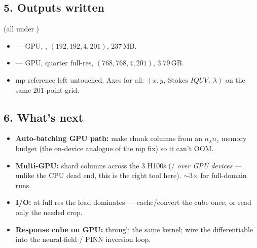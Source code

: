 \subsection*{5. Outputs written} (all under )
\begin{itemize}
  \item {} --- GPU, , $(192,192,4,201)$, 237\,MB.
  \item {} --- GPU, quarter full-res,
        $(768,768,4,201)$, 3.79\,GB.
  \item mp reference  left untouched. Axes for all:
        $(x, y,\ \text{Stokes } I Q U V,\ \lambda)$ on the same 201-point grid.
\end{itemize}

\subsection*{6. What's next}
\begin{itemize}
  \item \textbf{Auto-batching GPU path:} make  chunk columns from an
        $n_\lambda n_z$ memory budget (the on-device analogue of the mp  fix) so it can't OOM.
  \item \textbf{Multi-GPU:} shard columns across the 3 H100s (/ \emph{over
        GPU devices} --- unlike the CPU  dead end, this is the right tool here). $\sim$3$\times$
        for full-domain runs.
  \item \textbf{I/O:} at full res the load dominates --- cache/convert the cube once, or read only the
        needed crop.
  \item \textbf{Response cube on GPU:}  through the same kernel; wire the
        differentiable  into the neural-field / PINN inversion loop.
\end{itemize}


